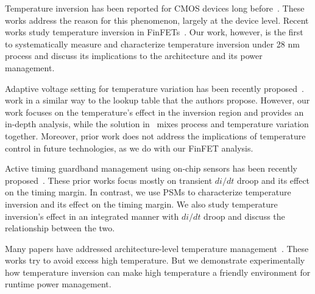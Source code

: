 Temperature inversion has been reported for CMOS devices long before~\cite{park1995reversal,bellaouar1998supply,dasdan2006handling,wolpert2012temperature}. These works address the reason for this phenomenon, largely at the device level. Recent works study temperature inversion in FinFETs~\cite{lee2014dynamic,cai2015tei}. Our work, however, is the first to systematically measure and characterize temperature inversion under 28 nm process and discuss its implications to the architecture and its power management. 

Adaptive voltage setting for temperature variation has been recently proposed~\cite{sriram2016avfs}. \tistates work in a similar way to the lookup table that the authors propose. However, our work focuses on the temperature's effect in the inversion region and provides an in-depth analysis, while the solution in~\cite{sriram2016avfs} mixes process and temperature variation together. Moreover, prior work does not address the implications of temperature control in future technologies, as we do with our FinFET analysis.

Active timing guardband management using on-chip sensors has been recently proposed~\cite{lefurgy2011active,zu2015adaptive}. These prior works focus mostly on transient $di/dt$ droop and its effect on the timing margin. In contrast, we use PSMs to characterize temperature inversion and its effect on the timing margin. We also study temperature inversion's effect in an integrated manner with $di/dt$ droop and discuss the relationship between the two.

Many papers have addressed architecture-level temperature management~\cite{skadron2004temperature,huang2006hotspot,fan2016computational,raghavan2012computational}. These works try to avoid excess high temperature. But we demonstrate experimentally how temperature inversion can make high temperature a friendly environment for runtime power management.
